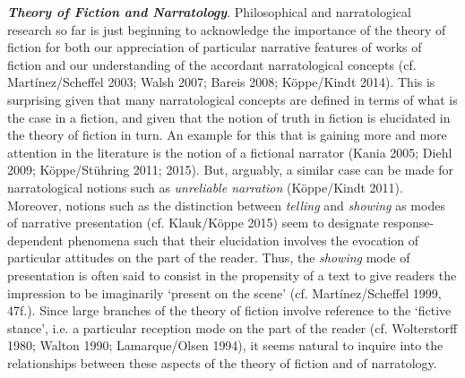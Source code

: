 \vspace{.2cm}
\noindent\textbf{\emph{Theory of Fiction and Narratology}}. Philosophical and narratological research so far is just beginning to acknowledge the importance of the theory of fiction for both our appreciation of particular narrative features of works of fiction and our understanding of the accordant narratological concepts (cf. Mart\'inez/Scheffel 2003; Walsh 2007; Bareis 2008; K\"oppe/Kindt 2014). This is surprising given that many narratological concepts are defined in terms of what is the case in a fiction, and given that the notion of truth in fiction is elucidated in the theory of fiction in turn. An example for this that is gaining more and more attention in the literature is the notion of a fictional narrator (Kania 2005; Diehl 2009; K\"oppe/St\"uhring 2011; 2015). But, arguably, a similar case can be made for narratological notions such as \emph{unreliable narration} (K\"oppe/Kindt 2011). Moreover, notions such as the distinction between \emph{telling} and \emph{showing} as modes of narrative presentation (cf. Klauk/K\"oppe 2015) seem to designate response-dependent phenomena such that their elucidation involves the evocation of particular attitudes on the part of the reader. Thus, the \emph{showing} mode of presentation is often said to consist in the propensity of a text to give readers the impression to be imaginarily `present on the scene' (cf. Mart\'inez/Scheffel 1999, 47f.). Since large branches of the theory of fiction involve reference to the `fictive stance', i.e. a particular reception mode on the part of the reader (cf. Wolterstorff 1980; Walton 1990; Lamarque/Olsen 1994), it seems natural to inquire into the relationships between these aspects of the theory of fiction and of narratology.



